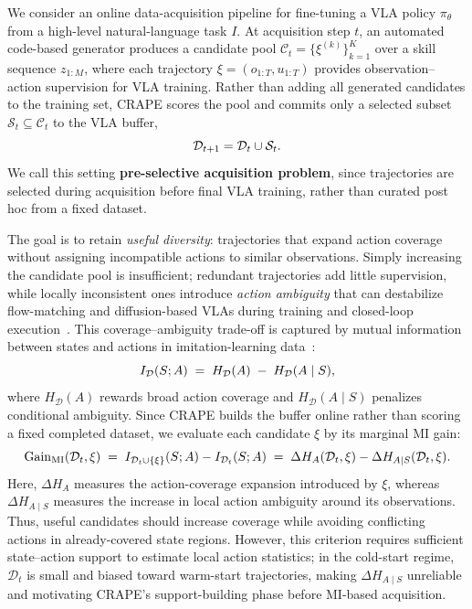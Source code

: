 \documentclass{article}
\begin{document}
We consider an online data-acquisition pipeline for fine-tuning a VLA policy $\pi_\theta$ from a high-level natural-language task $I$. 
At acquisition step $t$, an automated code-based generator produces a candidate pool $\mathcal{C}_t = \{\xi^{(k)}\}_{k=1}^{K}$ over a skill sequence $z_{1:M}$, where each trajectory $\xi=(o_{1:T},u_{1:T})$ provides observation--action supervision for VLA training. 
Rather than adding all generated candidates to the training set, CRAPE scores the pool and commits only a selected subset $\mathcal{S}_t \subseteq \mathcal{C}_t$ to the VLA buffer,
\begin{equation} \small
\mathcal{D}_{t+1} = \mathcal{D}_t \cup \mathcal{S}_t .
\end{equation}
We call this setting \textbf{pre-selective acquisition problem}, since trajectories are selected during acquisition before final VLA training, rather than curated post hoc from a fixed dataset.

The goal is to retain \emph{useful diversity}: trajectories that expand action coverage without assigning incompatible actions to similar observations. 
Simply increasing the candidate pool is insufficient; redundant trajectories add little supervision, while locally inconsistent ones introduce \emph{action ambiguity} that can destabilize flow-matching and diffusion-based VLAs during training and closed-loop execution~\citep{black2024pi_0, bjorck2025gr00t}. 
This coverage--ambiguity trade-off is captured by mutual information between states and actions in imitation-learning data~\citep{hejna2025robot}:
\begin{equation} \small
I_{\mathcal D}(S;A) \;=\; H_{\mathcal D}(A) \;-\; H_{\mathcal D}(A \mid S),
\label{eq:mi-classical}
\end{equation}
where $H_{\mathcal D}(A)$ rewards broad action coverage and $H_{\mathcal D}(A \mid S)$ penalizes conditional ambiguity. 
Since CRAPE builds the buffer online rather than scoring a fixed completed dataset, we evaluate each candidate $\xi$ by its marginal MI gain:
\begin{equation} \small
\mathrm{Gain}_{\mathrm{MI}}(\mathcal{D}_t, \xi)
\;=\;
I_{\mathcal{D}_t \cup \{\xi\}}(S;A)
-
I_{\mathcal{D}_t}(S;A)
\;=\;
\Delta H_A(\mathcal{D}_t, \xi)
-
\Delta H_{A \mid S}(\mathcal{D}_t, \xi).
\label{eq:marginal-mi-gain}
\end{equation}
Here, $\Delta H_A$ measures the action-coverage expansion introduced by $\xi$, whereas $\Delta H_{A \mid S}$ measures the increase in local action ambiguity around its observations. 
Thus, useful candidates should increase coverage while avoiding conflicting actions in already-covered state regions. 
However, this criterion requires sufficient state--action support to estimate local action statistics; in the cold-start regime, $\mathcal{D}_t$ is small and biased toward warm-start trajectories, making $\Delta H_{A \mid S}$ unreliable and motivating CRAPE's support-building phase before MI-based acquisition.
\end{document}
